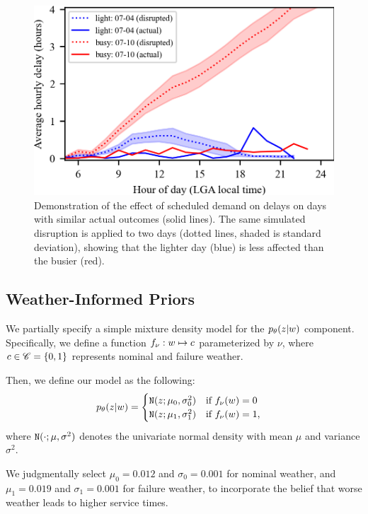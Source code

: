\begin{figure}[htb!]
    \centering
    \includegraphics[width=0.7\linewidth]{media/busy_light_comparison.png}
    \caption{Demonstration of the effect of scheduled demand on delays on days with similar actual outcomes (solid lines). The same simulated disruption is applied to two days (dotted lines, shaded is standard deviation), showing that the lighter day (blue) is less affected than the busier (red).}
    \label{fig:busy-light-comparison}
\end{figure}

\subsection{Weather-Informed Priors}

We partially specify a simple mixture density model for the $\pld{z\given w}$ component. Specifically, we define a function $f_{\nu}: w\mapsto c$ parameterized by $\nu$, where $c\in \mathscr{C} = \{0,1\}$ represents nominal and failure weather. 
\begin{proposition}
    Then, we define our model as the following:
    \begin{equation}
        \pld{z\given w} = \begin{cases}
            \mt N(z;\mu_0, \sigma_0^2) \quad \text{if }\fvd{w} = 0\\
            \mt N(z;\mu_1, \sigma_1^2) \quad \text{if }\fvd{w} = 1,
        \end{cases}
    \end{equation}
    where $\mathtt{N}(\cdot;\mu,\sigma^2)$ denotes the univariate normal density with mean $\mu$ and variance $\sigma^2$.
\end{proposition}

We judgmentally select $\mu_0 = 0.012$ and $\sigma_0 = 0.001$ for nominal weather, and $\mu_1 = 0.019$ and $\sigma_1 = 0.001$ for failure weather, to incorporate the belief that worse weather leads to higher service times. 

